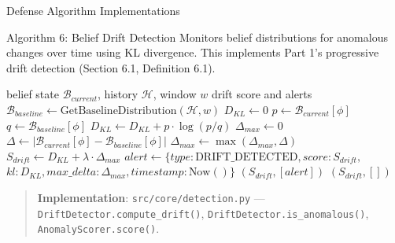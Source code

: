 \documentclass[
  ignorenonframetext,
]{beamer}
\begin{document}
\begin{frame}[fragile]{Defense Algorithm Implementations}
\begin{block}{Algorithm 6: Belief Drift Detection}
\protect{}\label{sec:alg-drift}
Monitors belief distributions for anomalous changes over time using KL
divergence. This implements Part 1's progressive drift detection
(Section 6.1, Definition 6.1).

\begin{algorithm}
\caption{Belief Drift Detection}
\label{alg:drift-impl}
\begin{algorithmic}[1]
\Require belief state $\mathcal{B}_{current}$, history $\mathcal{H}$, window $w$
\Ensure drift score and alerts
  \State $\mathcal{B}_{baseline} \gets \text{GetBaselineDistribution}(\mathcal{H}, w)$
  \State {}
  \State $D_{KL} \gets 0$
    \State $p \gets \mathcal{B}_{current}[\phi]$
    \State $q \gets \mathcal{B}_{baseline}[\phi]$
      \State $D_{KL} \gets D_{KL} + p \cdot \log(p / q)$
    \EndIf
  \EndFor
  \State {}
  \State $\Delta_{max} \gets 0$
    \State $\Delta \gets |\mathcal{B}_{current}[\phi] - \mathcal{B}_{baseline}[\phi]|$
    \State $\Delta_{max} \gets \max(\Delta_{max}, \Delta)$
  \EndFor
  \State {}
  \State $S_{drift} \gets D_{KL} + \lambda \cdot \Delta_{max}$
    \State $alert \gets \{type: \text{DRIFT\_DETECTED}, score: S_{drift},$
    \State \quad\quad\quad\quad $kl: D_{KL}, max\_delta: \Delta_{max}, timestamp: \text{Now}()\}$
    \Return $(S_{drift}, [alert])$
  \EndIf
  \Return $(S_{drift}, [])$
\EndFunction
\end{algorithmic}
\end{algorithm}

\begin{quote}
\textbf{Implementation}: \texttt{src/core/detection.py} ---
\texttt{DriftDetector.compute\_drift()},
\texttt{DriftDetector.is\_anomalous()}, \texttt{AnomalyScorer.score()}.
\end{quote}
\end{block}
\end{frame}
\end{document}
